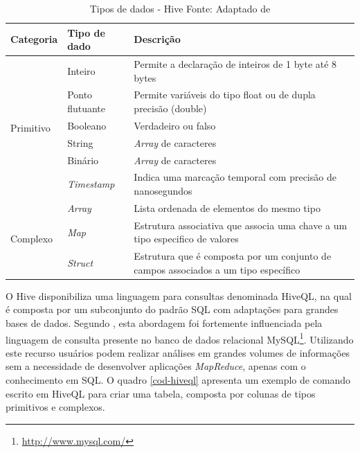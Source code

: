 \begin{table}[!ht]
\begin{center}
  \begin{tabular}{|p{3cm}|p{4cm}|p{4cm}|}
  \hline
  Categoria & Tipo de dado & Descrição \\ 
  \hline
  \multirow{6}{*}{Primitivo} 
  & Inteiro 		& Permite a declaração de inteiros de 1 byte até 8 bytes \\ \cline{2-3} 
  & Ponto flutuante 	& Permite variáveis do tipo float ou de dupla precisão (double) \\ \cline{2-3}
  & Booleano		& Verdadeiro ou falso \\ \cline{2-3}
  & String 		& \textit{Array} de caracteres \\ \cline{2-3}
  & Binário 		& \textit{Array} de caracteres \\ \cline{2-3}
  & \textit{Timestamp} 		& Indica uma marcação temporal com precisão de nanosegundos \\
  \hline
  \multirow{3}{*}{Complexo} 
  & \textit{Array} 		& Lista ordenada de elementos do mesmo tipo \\ \cline{2-3} 
  & \textit{Map} 		& Estrutura associativa que associa uma chave a um tipo especifico de valores \\ \cline{2-3}
  & \textit{Struct}		& Estrutura que é composta por um conjunto de campos associados a um tipo específico \\
  \hline
  \end{tabular}
  \captionsetup{justification=centering}
  \caption[Tipos de dados - Hive ]{Tipos de dados - Hive
  \protect\linebreak Fonte: Adaptado de \cite{white2012}}
\label{tab-hive-types}
\end{center}
\end{table}
\FloatBarrier

O Hive disponibiliza uma linguagem para consultas denominada HiveQL, na qual é composta por um subconjunto do padrão SQL com adaptações para grandes bases de dados. Segundo , esta abordagem foi fortemente influenciada pela linguagem de consulta presente no banco de dados relacional MySQL\footnote{\url{http://www.mysql.com/}}. Utilizando este recurso usuários podem realizar análises em grandes volumes de informações sem a necessidade de desenvolver aplicações \textit{MapReduce}, apenas com o conhecimento em SQL. O quadro \ref{cod-hiveql} apresenta um exemplo de comando escrito em HiveQL para criar uma tabela, composta por colunas de tipos primitivos e complexos.

